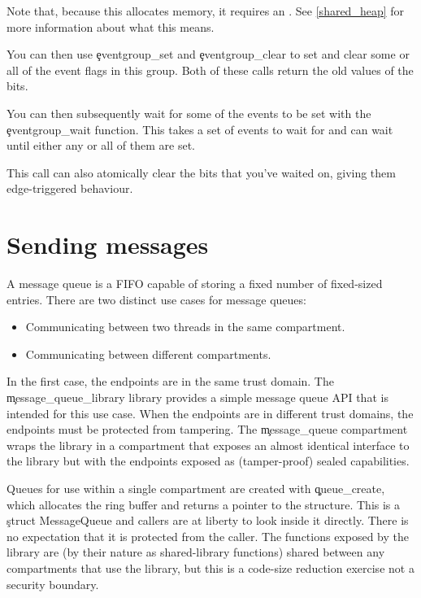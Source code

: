 
Note that, because this allocates memory, it requires an .
See \ref{shared_heap} for more information about what this means.

You can then use \c{eventgroup_set} and \c{eventgroup_clear} to set and clear some or all of the event flags in this group.
Both of these calls return the old values of the bits.



You can then subsequently wait for some of the events to be set with the \c{eventgroup_wait} function.
This takes a set of events to wait for and can wait until either any or all of them are set.


This call can also atomically clear the bits that you've waited on, giving them edge-triggered behaviour.

\section[label=message_queue]{Sending messages}

A message queue is a FIFO capable of storing a fixed number of fixed-sized entries.
There are two distinct use cases for message queues:

\begin{itemize}
	\item{Communicating between two threads in the same compartment.}
	\item{Communicating between different compartments.}
\end{itemize}

In the first case, the endpoints are in the same trust domain.
The \c{message_queue_library} library provides a simple message queue API that is intended for this use case.
When the endpoints are in different trust domains, the endpoints must be protected from tampering.
The \c{message_queue} compartment wraps the library in a compartment that exposes an almost identical interface to the library but with the endpoints exposed as (tamper-proof) sealed capabilities.

Queues for use within a single compartment are created with \c{queue_create}, which allocates the ring buffer and returns a pointer to the structure.
This is a \c{struct MessageQueue} and callers are at liberty to look inside it directly.
There is no expectation that it is protected from the caller.
The functions exposed by the library are (by their nature as shared-library functions) shared between any compartments that use the library, but this is a code-size reduction exercise not a security boundary.


